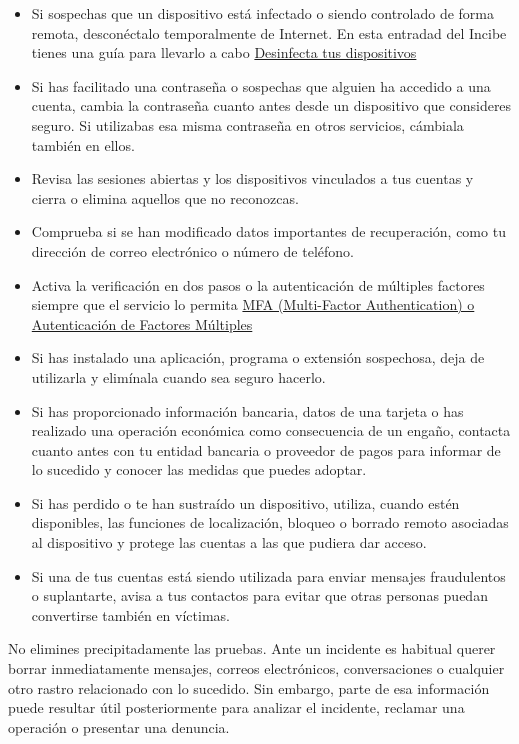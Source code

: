 \documentclass[
  spanish,
  a4paper,
  openany]{book}
\begin{document}
\begin{itemize}
\item
  Si sospechas que un dispositivo está infectado o siendo controlado de forma remota, desconéctalo temporalmente de Internet. En esta entradad del Incibe tienes una guía para llevarlo a cabo \href{https://www.incibe.es/ciudadania/ayuda/desinfeccion}{Desinfecta tus dispositivos}
\item
  Si has facilitado una contraseña o sospechas que alguien ha accedido a una cuenta, cambia la contraseña cuanto antes desde un dispositivo que consideres seguro. Si utilizabas esa misma contraseña en otros servicios, cámbiala también en ellos.
\item
  Revisa las sesiones abiertas y los dispositivos vinculados a tus cuentas y cierra o elimina aquellos que no reconozcas.
\item
  Comprueba si se han modificado datos importantes de recuperación, como tu dirección de correo electrónico o número de teléfono.
\item
  Activa la verificación en dos pasos o la autenticación de múltiples factores siempre que el servicio lo permita \hyperref[mfa-multi-factor-authentication-o-autenticaciuxf3n-de-factores-muxfaltiples]{MFA (Multi-Factor Authentication) o Autenticación de Factores Múltiples}
\item
  Si has instalado una aplicación, programa o extensión sospechosa, deja de utilizarla y elimínala cuando sea seguro hacerlo.
\item
  Si has proporcionado información bancaria, datos de una tarjeta o has realizado una operación económica como consecuencia de un engaño, contacta cuanto antes con tu entidad bancaria o proveedor de pagos para informar de lo sucedido y conocer las medidas que puedes adoptar.
\item
  Si has perdido o te han sustraído un dispositivo, utiliza, cuando estén disponibles, las funciones de localización, bloqueo o borrado remoto asociadas al dispositivo y protege las cuentas a las que pudiera dar acceso.
\item
  Si una de tus cuentas está siendo utilizada para enviar mensajes fraudulentos o suplantarte, avisa a tus contactos para evitar que otras personas puedan convertirse también en víctimas.
\end{itemize}

No elimines precipitadamente las pruebas. Ante un incidente es habitual querer borrar inmediatamente mensajes, correos electrónicos, conversaciones o cualquier otro rastro relacionado con lo sucedido. Sin embargo, parte de esa información puede resultar útil posteriormente para analizar el incidente, reclamar una operación o presentar una denuncia.
\end{document}

